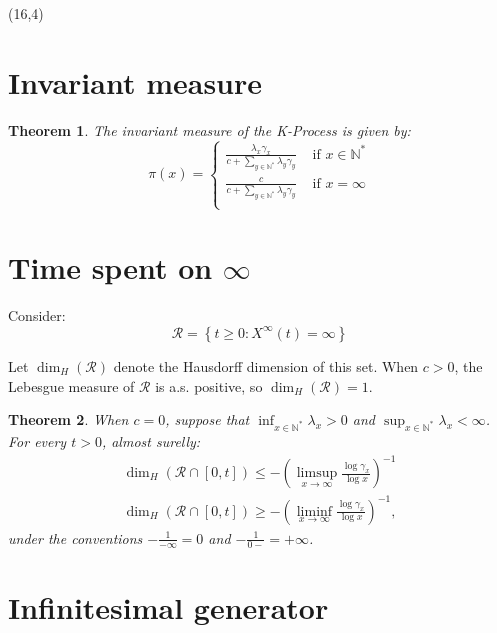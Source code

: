 \documentclass[a1,portrait]{a0poster}
\newtheorem*{teorema}{Theorem}
\newcommand{\RR}{{\mathcal{R}}}
\newcommand{\Nz}{{\mathbb{N^*}}}
\begin{document}
\begin{textblock}{15}(16,4) 
  

  \section{Invariant measure}

  \begin{teorema}
    The invariant measure of the K-Process is given by:
    \begin{displaymath}
      \pi(x) = \begin{cases}
        \frac{\lambda_x \gamma_x}{c + \sum_{y \in \Nz} \lambda_y \gamma_y}
        & \textrm{ if } x \in \Nz \\
        \frac{c}{c + \sum_{y \in \Nz} \lambda_y \gamma_y}
        & \textrm{ if } x = \infty \\
      \end{cases}
    \end{displaymath}
  \end{teorema}

  \section{Time spent on $\infty$}

  Consider:
  \begin{displaymath}
    \RR = \left\{ t \geq 0: X^\infty(t) = \infty \right\}
  \end{displaymath}

  Let $\dim_H(\RR)$ denote the Hausdorff dimension of this set. When
  $c > 0$, the Lebesgue measure of $\RR$ is a.s. positive, so
  $\dim_H(\RR) = 1$.

\begin{teorema}
  \label{cor:log-haus}
  When $c = 0$, suppose that $\inf_{x \in \Nz} \lambda_x > 0$ and $\sup_{x \in \Nz}
  \lambda_x < \infty$. For every $t > 0$, almost surelly:
  \begin{gather*}
    \dim_H(\RR \cap [0, t]) \leq
    - \left( \limsup_{x \to \infty} \frac{\log \gamma_x}{\log x}
    \right)^{-1} \\
    \dim_H(\RR \cap [0, t]) \geq
    - \left( \liminf_{x \to \infty} \frac{\log \gamma_x}{\log x}
    \right)^{-1},
  \end{gather*}
  under the conventions $-\frac{1}{-\infty} = 0$ and $-\frac{1}{0-} =
  +\infty$.
\end{teorema}


\section{Infinitesimal generator}


\end{textblock}
\end{document}
